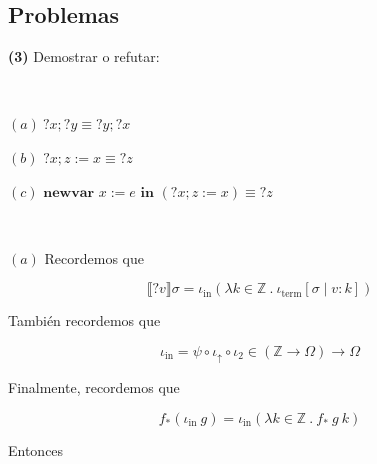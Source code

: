 \documentclass[a4paper, 12pt]{article}
\begin{document}
\pagebreak

\subsection{Problemas}
\begin{myframe}
  \textbf{(3)} Demostrar o refutar:

  ~

  $(a) ~ ?x; ?y \equiv ?y; ?x$

  $(b)$ $?x;z := x \equiv ? z$ 

  $(c)$ $\textbf{newvar } x := e \textbf{ in } (?x; z := x) \equiv ?z$
\end{myframe}

~

$(a)$ Recordemos que 

\begin{equation}
  \llbracket ?v \rrbracket \sigma = \iota_{\text{in}}\left( \lambda k \in
  \mathbb{Z} ~.~ \iota_{\text{term}} [\sigma \mid v : k] \right) 
\end{equation}

También recordemos que 

\begin{equation*}
  \iota_{\text{in}} = \psi \circ \iota_\uparrow \circ \iota_2 \in (\mathbb{Z}
  \to \Omega) \to \Omega
\end{equation*}

Finalmente, recordemos que 

\begin{equation}
  f_*(\iota_{\text{in}} ~ g) = \iota_{\text{in}} \left( \lambda k \in \mathbb{Z}
  ~ . ~ f_* ~ g ~ k\right) 
\end{equation}

Entonces
\end{document}
